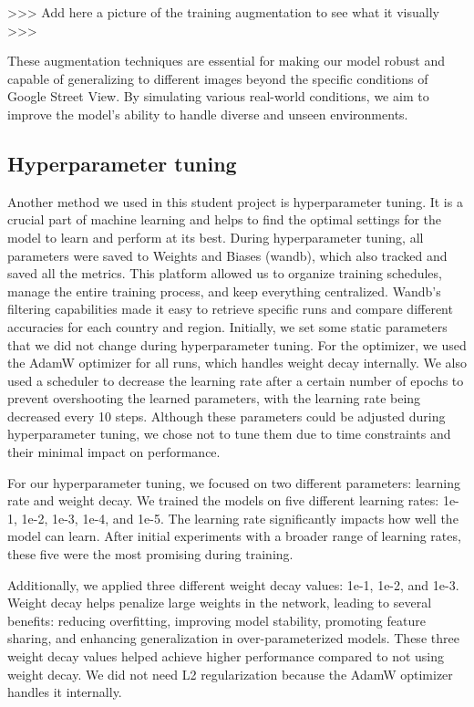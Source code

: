 \documentclass{article}
\begin{document}
\textgreater\textgreater\textgreater{} Add here a picture of the
training augmentation to see what it visually
\textgreater\textgreater\textgreater{}

These augmentation techniques are essential for making our model robust
and capable of generalizing to different images beyond the specific
conditions of Google Street View. By simulating various real-world
conditions, we aim to improve the model's ability to handle diverse and
unseen environments.

\subsection{Hyperparameter tuning}\label{hyperparameter-tuning}

Another method we used in this student project is hyperparameter tuning.
It is a crucial part of machine learning and helps to find the optimal
settings for the model to learn and perform at its best. During
hyperparameter tuning, all parameters were saved to Weights and Biases
(wandb), which also tracked and saved all the metrics. This platform
allowed us to organize training schedules, manage the entire training
process, and keep everything centralized. Wandb's filtering capabilities
made it easy to retrieve specific runs and compare different accuracies
for each country and region. Initially, we set some static parameters
that we did not change during hyperparameter tuning. For the optimizer,
we used the AdamW optimizer for all runs, which handles weight decay
internally. We also used a scheduler to decrease the learning rate after
a certain number of epochs to prevent overshooting the learned
parameters, with the learning rate being decreased every 10 steps.
Although these parameters could be adjusted during hyperparameter
tuning, we chose not to tune them due to time constraints and their
minimal impact on performance.

For our hyperparameter tuning, we focused on two different parameters:
learning rate and weight decay. We trained the models on five different
learning rates: 1e-1, 1e-2, 1e-3, 1e-4, and 1e-5. The learning rate
significantly impacts how well the model can learn. After initial
experiments with a broader range of learning rates, these five were the
most promising during training.

Additionally, we applied three different weight decay values: 1e-1,
1e-2, and 1e-3. Weight decay helps penalize large weights in the
network, leading to several benefits: reducing overfitting, improving
model stability, promoting feature sharing, and enhancing generalization
in over-parameterized models. These three weight decay values helped
achieve higher performance compared to not using weight decay. We did
not need L2 regularization because the AdamW optimizer handles it
internally.
\end{document}

